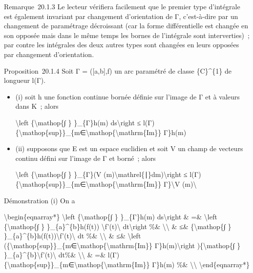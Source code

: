 \documentclass[]{article}
\begin{document}
Remarque~20.1.3 Le lecteur vérifiera facilement que le premier type
d'intégrale est également invariant par changement d'orientation de Γ,
c'est-à-dire par un changement de paramétrage décroissant (car la forme
différentielle est changée en son opposée mais dans le même temps les
bornes de l'intégrale sont interverties)~; par contre les intégrales des
deux autres types sont changées en leurs opposées par changement
d'orientation.

Proposition~20.1.4 Soit Γ = ({[}a,b{]},f) un arc paramétré de classe
\{C\}\^{}\{1\} de longueur l(Γ).

\begin{itemize}
\item
  (i) soit h une fonction continue bornée définie sur l'image de Γ et à
  valeurs dans K~; alors

  \textbackslash{}left \textbar{}\{\textbackslash{}mathop\{∫ \}
  \}\_\{Γ\}h(m) ds\textbackslash{}right \textbar{} ≤
  l(Γ)\{\textbackslash{}mathop\{sup\}\}\_\{m∈\textbackslash{}mathop\{\textbackslash{}mathrm\{Im\}\}
  Γ\}\textbar{}h(m)\textbar{}
\item
  (ii) supposons que E est un espace euclidien et soit V un champ de
  vecteurs continu défini sur l'image de Γ et borné~; alors

  \textbackslash{}left \textbar{}\{\textbackslash{}mathop\{∫ \}
  \}\_\{Γ\}(V (m)\textbackslash{}mathrel\{∣\}dm)\textbackslash{}right
  \textbar{} ≤
  l(Γ)\{\textbackslash{}mathop\{sup\}\}\_\{m∈\textbackslash{}mathop\{\textbackslash{}mathrm\{Im\}\}
  Γ\}\textbackslash{}\textbar{}V (m)\textbackslash{}\textbar{}
\end{itemize}

Démonstration (i) On a

\textbackslash{}begin\{eqnarray*\} \textbackslash{}left
\textbar{}\{\textbackslash{}mathop\{∫ \} \}\_\{Γ\}h(m)
ds\textbackslash{}right \textbar{}\& =\& \textbackslash{}left
\textbar{}\{\textbackslash{}mathop\{∫ \} \}\_\{a\}\^{}\{b\}h(f(t))
\textbackslash{}\textbar{}f'(t)\textbackslash{}\textbar{}
dt\textbackslash{}right \textbar{} \%\& \textbackslash{}\textbackslash{}
\& ≤\& \{\textbackslash{}mathop\{∫ \}
\}\_\{a\}\^{}\{b\}\textbar{}h(f(t))\textbar{}\textbackslash{}\textbar{}f'(t)\textbackslash{}\textbar{}
dt \%\& \textbackslash{}\textbackslash{} \& ≤\& \textbackslash{}left
(\{\textbackslash{}mathop\{sup\}\}\_\{m∈\textbackslash{}mathop\{\textbackslash{}mathrm\{Im\}\}
Γ\}\textbar{}h(m)\textbar{}\textbackslash{}right
)\{\textbackslash{}mathop\{∫ \}
\}\_\{a\}\^{}\{b\}\textbackslash{}\textbar{}f'(t)\textbackslash{}\textbar{}
dt\%\& \textbackslash{}\textbackslash{} \& =\&
l(Γ)\{\textbackslash{}mathop\{sup\}\}\_\{m∈\textbackslash{}mathop\{\textbackslash{}mathrm\{Im\}\}
Γ\}\textbar{}h(m)\textbar{} \%\& \textbackslash{}\textbackslash{}
\textbackslash{}end\{eqnarray*\}
\end{document}
